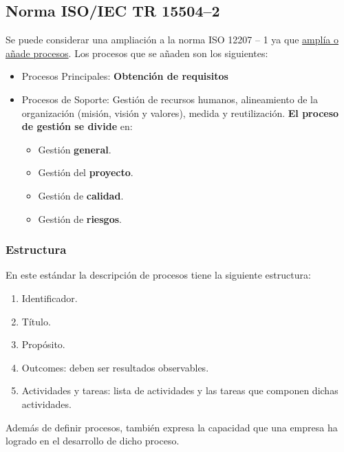 \subsection{Norma ISO/IEC TR 15504--2}
Se puede considerar una ampliación a la norma ISO 12207 – 1 ya que \uline{amplía o añade procesos}. Los procesos que se añaden son los siguientes:



\begin{itemize}
    \item Procesos Principales: \textbf{Obtención de requisitos}
    \item Procesos de Soporte: Gestión de recursos humanos, alineamiento de la organización (misión, visión y valores), medida y reutilización. \textbf{El proceso de gestión se divide} en:
    \begin{itemize}
        \item Gestión \textbf{general}.
        \item Gestión del \textbf{proyecto}.
        \item Gestión de \textbf{calidad}.
        \item Gestión de \textbf{riesgos}.
    \end{itemize}
\end{itemize}

\subsubsection{Estructura}
En este estándar la descripción de procesos tiene la siguiente estructura:
\begin{enumerate} %
    \item Identificador. %
    \item Título.%
    \item Propósito.%
    \item Outcomes: deben ser resultados observables.
    \item Actividades y tareas: lista de actividades y las tareas que componen dichas actividades.
\end{enumerate}
Además de definir procesos, también expresa la capacidad que una empresa ha logrado en el desarrollo de dicho proceso.\\



